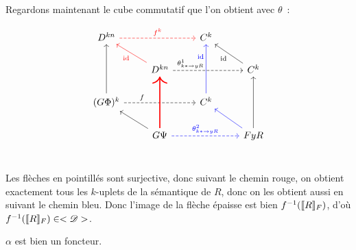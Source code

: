 \begin{pv}
    Regardons maintenant le cube commutatif que l'on obtient avec $\theta$~:

    \[\begin{tikzcd}
        D^{kn}\arrow[rr, dashed, red, "f^k"] & &
            C^k & \\
        & D^{kn}\arrow[ul, red, "\id"]
                \arrow[rr, near start, dashed, "\theta_{k\ast\rightarrow yR}^1"] & &
            C^k\arrow[ul, "\id"] \\
        (G\Phi)^k\arrow[uu]\arrow[rr, near start, dashed, "f"] & &
            C^k\arrow[uu, near end, blue, "\id"] & \\
        & G\Psi\arrow[ul]\arrow[uu, red, very thick]
               \arrow[rr, dashed, blue, "\theta_{k\ast\rightarrow yR}^2"] & &
            FyR\arrow[uu]\arrow[ul, blue] \\
    \end{tikzcd}\]

    Les flèches en pointillés sont surjective, donc suivant le chemin rouge, on obtient
    exactement tous les $k$-uplets de la sémantique de $R$, donc on les obtient aussi
    en suivant le chemin bleu. Donc l'image de la flèche épaisse est bien
    $f^{-1}(\llbracket {R} \rrbracket_F)$, d'où $f^{-1}(\llbracket {R} \rrbracket_F)\in<\mathscr{D}>$.
\end{pv}

\begin{prop}
    $\alpha$ est bien un foncteur.
\end{prop}

